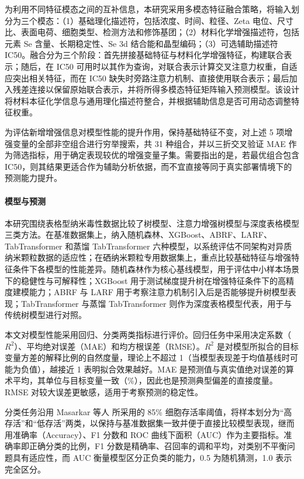为利用不同特征模态之间的互补信息，本研究采用多模态特征融合策略，将输入划分为三个模态：（1）基础理化描述符，包括浓度、时间、粒径、Zeta 电位、尺寸比、表面电荷、细胞类型、检测方法和修饰基团；（2）材料化学增强描述符，包括元素 Se 含量、长期稳定性、Se 3d 结合能和晶型编码；（3）可选辅助描述符 IC50。融合分为三个阶段：首先拼接基础特征与材料化学增强特征，构建联合表示；随后，在 IC50 可用时以其作为查询，对联合表示计算交叉注意力权重，自适应突出相关特征，而在 IC50 缺失时旁路注意力机制、直接使用联合表示；最后加入残差连接以保留原始联合表示，并将所得多模态特征矩阵输入预测模型。该设计将材料本征化学信息与通用理化描述符整合，并根据辅助信息是否可用动态调整特征权重。

为评估新增增强信息对模型性能的提升作用，保持基础特征不变，对上述 5 项增强变量的全部非空组合进行穷举搜索，共 31 种组合，并以三折交叉验证 MAE 作为筛选指标，用于确定表现较优的增强变量子集。需要指出的是，若最优组合包含 IC50，则其结果更适合作为辅助分析依据，而不宜直接等同于真实部署情境下的预测能力提升。

\paragraph{模型与预测}
本研究围绕表格型纳米毒性数据比较了树模型、注意力增强树模型与深度表格模型三类方法。在基准数据集上，纳入随机森林、XGBoost、ABRF、LARF、TabTransformer 和蒸馏 TabTransformer 六种模型，以系统评估不同架构对异质纳米颗粒数据的适应性；在硒纳米颗粒专用数据集上，重点比较基础特征与增强特征条件下各模型的性能差异。随机森林作为核心基线模型，用于评估中小样本场景下的稳健性与可解释性；XGBoost 用于测试梯度提升树在增强特征条件下的高精度建模能力；ABRF 与 LARF 用于考察注意力机制引入后是否能够提升树模型表现；TabTransformer 与蒸馏 TabTransformer 则作为深度表格模型代表，用于与传统树模型进行对照。

本文对模型性能采用回归、分类两类指标进行评价。回归任务中采用决定系数（\(R^2\)）、平均绝对误差（MAE）和均方根误差（RMSE）。\(R^2\) 是对模型所拟合的目标变量方差的解释比例的自然度量，理论上不超过 1（当模型表现差于均值基线时可能为负值），越接近 1 表明拟合效果越好。MAE 是预测值与真实值绝对误差的算术平均，其单位与目标变量一致（\%），因此也是预测典型偏差的直接度量。RMSE 对较大误差更敏感，适用于考察预测的稳定性。

分类任务沿用 Masarkar 等人\cite{masarkar2024} 所采用的 85\% 细胞存活率阈值，将样本划分为“高存活”和“低存活”两类，以保持与基准数据集一致并便于直接比较模型表现，继而用准确率（Accuracy）、F1 分数和 ROC 曲线下面积（AUC）作为主要指标。准确率即正确分类的比例，F1 分数是精确率、召回率的调和平均，对类别不平衡问题具有适应性，而 AUC 衡量模型区分正负类的能力，0.5 为随机猜测，1.0 表示完全区分。

